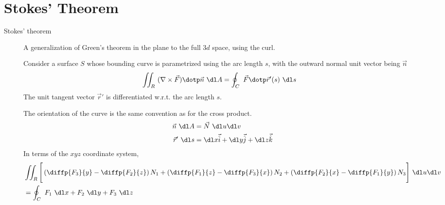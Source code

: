 \section{Stokes' Theorem}

\begin{description}
    \item[Stokes' theorem] A generalization of Green's theorem in the plane to the full
        $ 3d $ space, using the curl. \par
        Consider a surface $ S $ whose bounding curve is parametrized using the arc length
        $ s $, with the outward normal unit vector being $ \vec{n} $
        \begin{align}
            \iint_R\ (\nabla \times \vec{F}) \dotp \vec{n}\ \dl A
             & = \oint_C\ \vec{F} \dotp \vec{r}'(s)\ \dl s
        \end{align}
        The unit tangent vector $ \vec{r}' $ is differentiated w.r.t. the arc length
        $ s $. \par
        The orientation of the curve is the same convention as for the cross product.
        \begin{align}
            \vec{n}\ \dl A  & = \vec{N}\ \dl u \dl v                      \\
            \vec{r}'\ \dl s & = \dl x \vec{\hat{i}} + \dl y \vec{\hat{j}}
            + \dl z \vec{\hat{k}}
        \end{align}
        In terms of the $ xyz $ coordinate system,
        \begin{align}
             & \iint_R \Bigg[\left( \diffp {F_3}{y} - \diffp{F_2}{z} \right) N_1
                + \left( \diffp {F_1}{z} - \diffp{F_3}{x} \right) N_2
                + \left( \diffp {F_2}{x} - \diffp{F_1}{y} \right) N_3\Bigg]
            \ \dl u \dl v                                                        \\
             & = \oint_C\ F_1\ \dl x + F_2\ \dl y + F_3\ \dl z
        \end{align}


\end{description}
